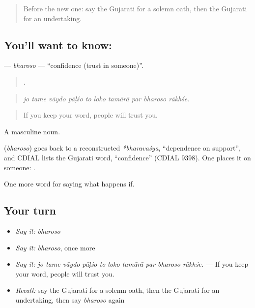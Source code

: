 \label{lesson:GU-C541-bharoso}



\begin{quote}
Before the new one: say the Gujarati for a solemn oath, then the Gujarati for an undertaking.
\end{quote}

\subsection*{You'll want to know: }
\textbf{} — \emph{bharoso} — \textquotedblleft{}confidence (trust in someone)\textquotedblright{}.

\begin{quote}
         .
\end{quote}

\begin{quote}
\emph{jo tame vāydo pāḷśo to loko tamārā par bharoso rākhśe.}
\end{quote}

\begin{quote}
If you keep your word, people will trust you.
\end{quote}

A masculine noun.

\begin{cousinweb}
\textbf{} (\emph{bharoso}) goes back to a reconstructed \emph{*bharavaśya}, \textquotedblleft{}dependence on support\textquotedblright{}, and CDIAL lists the Gujarati word, \textquotedblleft{}confidence\textquotedblright{} (CDIAL 9398). One places it on someone: \textbf{  }.
\end{cousinweb}

\begin{grammarlens}[title={What you've built}]
One more word for saying what happens if.
\end{grammarlens}

\subsection*{Your turn}
\begin{itemize}
\raggedright
  \item \emph{Say it:} \emph{bharoso}
  \item \emph{Say it:} \emph{bharoso}, once more
  \item \emph{Say it:} \emph{jo tame vāydo pāḷśo to loko tamārā par bharoso rākhśe.} — If you keep your word, people will trust you.
  \item \emph{Recall:} say the Gujarati for a solemn oath, then the Gujarati for an undertaking, then say \emph{bharoso} again
\end{itemize}

